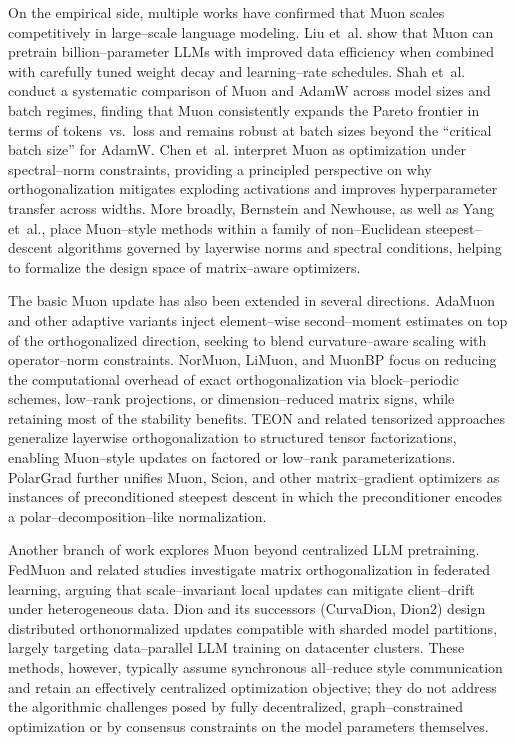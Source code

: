 On the empirical side, multiple works have confirmed that Muon scales competitively in large–scale language modeling. Liu et~al. show that Muon can pretrain billion–parameter LLMs with improved data efficiency when combined with carefully tuned weight decay and learning–rate schedules. Shah et~al. conduct a systematic comparison of Muon and AdamW across model sizes and batch regimes, finding that Muon consistently expands the Pareto frontier in terms of tokens~vs.~loss and remains robust at batch sizes beyond the ``critical batch size'' for AdamW. Chen et~al. interpret Muon as optimization under spectral–norm constraints, providing a principled perspective on why orthogonalization mitigates exploding activations and improves hyperparameter transfer across widths. More broadly, Bernstein and Newhouse, as well as Yang et~al., place Muon–style methods within a family of non–Euclidean steepest–descent algorithms governed by layerwise norms and spectral conditions, helping to formalize the design space of matrix–aware optimizers.

The basic Muon update has also been extended in several directions. AdaMuon and other adaptive variants inject element–wise second–moment estimates on top of the orthogonalized direction, seeking to blend curvature–aware scaling with operator–norm constraints. NorMuon, LiMuon, and MuonBP focus on reducing the computational overhead of exact orthogonalization via block–periodic schemes, low–rank projections, or dimension–reduced matrix signs, while retaining most of the stability benefits. TEON and related tensorized approaches generalize layerwise orthogonalization to structured tensor factorizations, enabling Muon–style updates on factored or low–rank parameterizations. PolarGrad further unifies Muon, Scion, and other matrix–gradient optimizers as instances of preconditioned steepest descent in which the preconditioner encodes a polar–decomposition–like normalization.

Another branch of work explores Muon beyond centralized LLM pretraining. FedMuon and related studies investigate matrix orthogonalization in federated learning, arguing that scale–invariant local updates can mitigate client–drift under heterogeneous data. Dion and its successors (CurvaDion, Dion2) design distributed orthonormalized updates compatible with sharded model partitions, largely targeting data–parallel LLM training on datacenter clusters. These methods, however, typically assume synchronous all–reduce style communication and retain an effectively centralized optimization objective; they do not address the algorithmic challenges posed by fully decentralized, graph–constrained optimization or by consensus constraints on the model parameters themselves.

